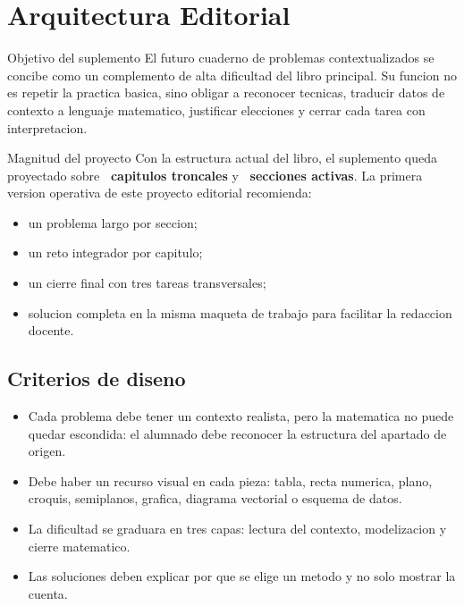 \chapter{Arquitectura Editorial}

\begin{planningbox}{Objetivo del suplemento}
El futuro cuaderno de problemas contextualizados se concibe como un complemento de alta
dificultad del libro principal. Su funcion no es repetir la practica basica, sino obligar a
reconocer tecnicas, traducir datos de contexto a lenguaje matematico, justificar elecciones y
cerrar cada tarea con interpretacion.
\end{planningbox}

\begin{databox}{Magnitud del proyecto}
Con la estructura actual del libro, el suplemento queda proyectado sobre
\textbf{\SupplementChapterCount\ capitulos troncales} y \textbf{\SupplementSectionCount\
secciones activas}. La primera version operativa de este proyecto editorial recomienda:
\begin{itemize}
  \item un problema largo por seccion;
  \item un reto integrador por capitulo;
  \item un cierre final con tres tareas transversales;
  \item solucion completa en la misma maqueta de trabajo para facilitar la redaccion docente.
\end{itemize}
\end{databox}

\section{Criterios de diseno}

\begin{itemize}
  \item Cada problema debe tener un contexto realista, pero la matematica no puede quedar
  escondida: el alumnado debe reconocer la estructura del apartado de origen.
  \item Debe haber un recurso visual en cada pieza: tabla, recta numerica, plano, croquis,
  semiplanos, grafica, diagrama vectorial o esquema de datos.
  \item La dificultad se graduara en tres capas: lectura del contexto, modelizacion y cierre
  matematico.
  \item Las soluciones deben explicar por que se elige un metodo y no solo mostrar la cuenta.
\end{itemize}

